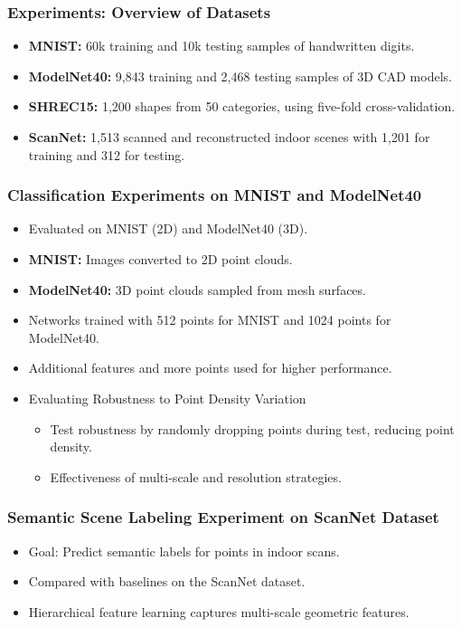 \documentclass[11pt,xcolor={dvipsnames},hyperref={pdftex,pdfpagemode=UseNone,hidelinks,pdfdisplaydoctitle=true},usepdftitle=false]{beamer}
\begin{document}
\begin{frame}
\frametitle{Experiments: Overview of Datasets}
\begin{itemize}
    \item \textbf{MNIST:} 60k training and 10k testing samples of handwritten digits.
    \item \textbf{ModelNet40:} 9,843 training and 2,468 testing samples of 3D CAD models.
    \item \textbf{SHREC15:} 1,200 shapes from 50 categories, using five-fold cross-validation.
    \item \textbf{ScanNet:} 1,513 scanned and reconstructed indoor scenes with 1,201 for training and 312 for testing.
\end{itemize}
\end{frame}

\begin{frame}
\frametitle{Classification Experiments on MNIST and ModelNet40}
\begin{itemize}
    \item Evaluated on MNIST (2D) and ModelNet40 (3D).
    \item \textbf{MNIST:} Images converted to 2D point clouds.
    \item \textbf{ModelNet40:} 3D point clouds sampled from mesh surfaces.
    \item Networks trained with 512 points for MNIST and 1024 points for ModelNet40.
    \item Additional features and more points used for higher performance.
    \item Evaluating Robustness to Point Density Variation 
    \begin{itemize}
      \item Test robustness by randomly dropping points during test, reducing point density.
      \item Effectiveness of multi-scale and resolution strategies.
  \end{itemize}
\end{itemize}
\end{frame}

\begin{frame}
\frametitle{Semantic Scene Labeling Experiment on ScanNet Dataset}
\begin{itemize}
    \item Goal: Predict semantic labels for points in indoor scans.
    \item Compared with baselines on the ScanNet dataset.
    \item Hierarchical feature learning captures multi-scale geometric features.
\end{itemize}
\end{frame}
\end{document}
